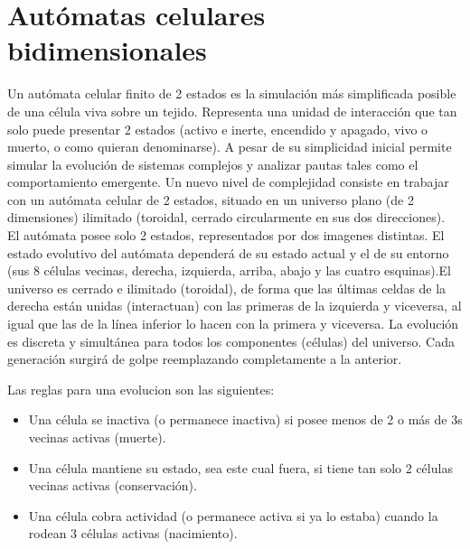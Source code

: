\documentclass[14pt]{article}
\begin{document}
\section{Autómatas celulares bidimensionales}

    Un autómata celular finito de 2 estados es la simulación más simplificada posible de una célula viva sobre un tejido. Representa una unidad de interacción que tan solo puede presentar 2 estados (activo e inerte, encendido y apagado, vivo o muerto, o como quieran denominarse). A pesar de su simplicidad inicial permite simular la evolución de sistemas complejos y analizar pautas tales como el comportamiento emergente.
    Un nuevo nivel de complejidad consiste en trabajar con un autómata celular de 2 estados, situado en un universo plano (de 2 dimensiones) ilimitado (toroidal, cerrado circularmente en sus dos direcciones).\\
    
    
El autómata posee solo 2 estados, representados por dos imagenes distintas. El estado evolutivo del autómata dependerá de su estado actual y el de su entorno (sus 8 células vecinas, derecha, izquierda, arriba, abajo y las cuatro esquinas).El universo es cerrado e ilimitado (toroidal), de forma que las últimas celdas de la derecha están unidas (interactuan) con las primeras de la izquierda y viceversa, al igual que las de la línea inferior lo hacen con la primera y viceversa. La evolución es discreta y simultánea para todos los componentes (células) del universo. Cada generación surgirá de golpe reemplazando completamente a la anterior.

\clearpage

Las reglas para una evolucion son las siguientes:
\begin{itemize}
\item Una célula se inactiva (o permanece inactiva) si posee menos de 2 o más de 3s vecinas activas (muerte).
\item Una célula mantiene su estado, sea este cual fuera, si tiene tan solo 2 células vecinas activas (conservación).
\item Una célula cobra actividad (o permanece activa si ya lo estaba) cuando la rodean 3 células activas (nacimiento).
\end{itemize}
\end{document}
